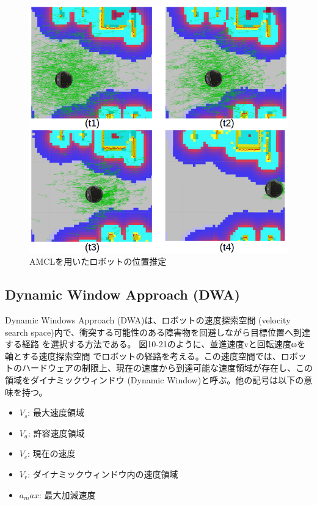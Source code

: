 \begin{figure}[htp]
  \centering
  \includegraphics[width=12cm]{pictures/chapter10/pic_10_20.png}
  \caption{AMCLを用いたロボットの位置推定}
\end{figure}


\subsection{Dynamic Window Approach (DWA)}

Dynamic Windows Approach (DWA)は、ロボットの速度探索空間 (velocity search space)内で、衝突する可能性のある障害物を回避しながら目標位置へ到達する経路  を選択する方法である。
 図10-21のように、並進速度vと回転速度ωを軸とする速度探索空間 でロボットの経路を考える。この速度空間では、ロボットのハードウェアの制限上、現在の速度から到達可能な速度領域が存在し、この領域をダイナミックウィンドウ (Dynamic Window)と呼ぶ。他の記号は以下の意味を持つ。

\begin{itemize}
\item $V_s$: 最大速度領域
\item $V_a$: 許容速度領域
\item $V_c$: 現在の速度
\item $V_r$: ダイナミックウィンドウ内の速度領域
\item $a_max$: 最大加減速度
\end{itemize}


